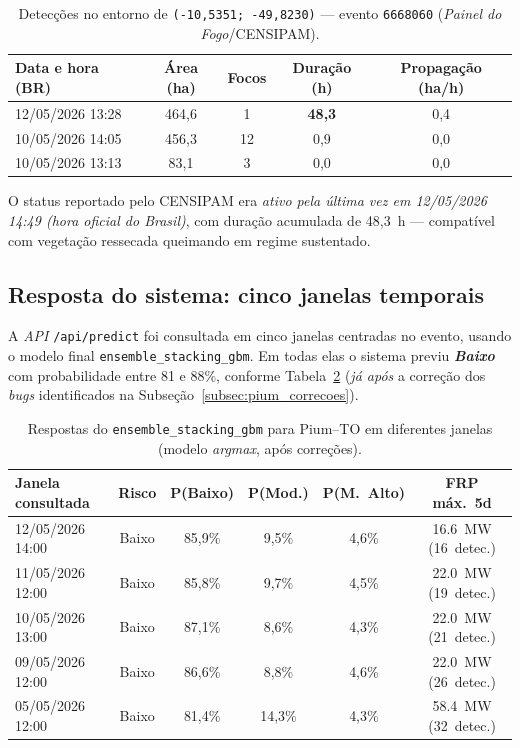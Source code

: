 \begin{table}[h]
\centering
\caption{Detecções no entorno de \texttt{(-10{,}5351; -49{,}8230)} --- evento \texttt{6668060} (\emph{Painel do Fogo}/CENSIPAM).}
\label{tab:pium_evento}
\small
\begin{tabular}{lcccc}
\toprule
\textbf{Data e hora (BR)} & \textbf{Área (ha)} & \textbf{Focos} & \textbf{Duração (h)} & \textbf{Propagação (ha/h)} \\
\midrule
12/05/2026 13:28 & 464,6 & 1  & \textbf{48,3} & 0,4 \\
10/05/2026 14:05 & 456,3 & 12 & 0,9  & 0,0 \\
10/05/2026 13:13 & 83,1  & 3  & 0,0  & 0,0 \\
\bottomrule
\end{tabular}
\end{table}

O status reportado pelo CENSIPAM era \emph{ativo pela última vez em 12/05/2026 14:49 (hora oficial do Brasil)}, com duração acumulada de 48,3~h --- compatível com vegetação ressecada queimando em regime sustentado.

\subsection{Resposta do sistema: cinco janelas temporais}
\label{subsec:pium_resposta}

A \emph{API} \texttt{/api/predict} foi consultada em cinco janelas centradas no evento, usando o modelo final \texttt{ensemble\_stacking\_gbm}. Em todas elas o sistema previu \textbf{\emph{Baixo}} com probabilidade entre 81 e 88\%, conforme Tabela~\ref{tab:pium_respostas_pos_fix} (\emph{já após} a correção dos \emph{bugs} identificados na Subseção~\ref{subsec:pium_correcoes}).

\begin{table}[h]
\centering
\caption{Respostas do \texttt{ensemble\_stacking\_gbm} para Pium--TO em diferentes janelas (modelo \emph{argmax}, após correções).}
\label{tab:pium_respostas_pos_fix}
\small
\begin{tabular}{lccccc}
\toprule
\textbf{Janela consultada}     & \textbf{Risco} & \textbf{P(Baixo)} & \textbf{P(Mod.)} & \textbf{P(M.~Alto)} & \textbf{FRP máx.~5d} \\
\midrule
12/05/2026 14:00 & Baixo & 85,9\% & 9,5\%  & 4,6\% & \SI{16,6}{\mega\watt} (16~detec.) \\
11/05/2026 12:00 & Baixo & 85,8\% & 9,7\%  & 4,5\% & \SI{22,0}{\mega\watt} (19~detec.) \\
10/05/2026 13:00 & Baixo & 87,1\% & 8,6\%  & 4,3\% & \SI{22,0}{\mega\watt} (21~detec.) \\
09/05/2026 12:00 & Baixo & 86,6\% & 8,8\%  & 4,6\% & \SI{22,0}{\mega\watt} (26~detec.) \\
05/05/2026 12:00 & Baixo & 81,4\% & 14,3\% & 4,3\% & \SI{58,4}{\mega\watt} (32~detec.) \\
\bottomrule
\end{tabular}
\end{table}

